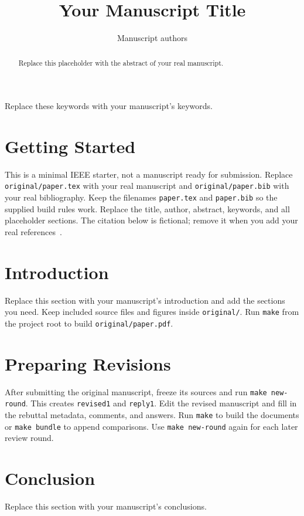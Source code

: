 \documentclass[journal]{IEEEtran}
\title{Your Manuscript Title}
\author{Manuscript authors}
\begin{document}
\maketitle
\begin{abstract}
Replace this placeholder with the abstract of your real manuscript.
\end{abstract}
\begin{IEEEkeywords}
Replace these keywords with your manuscript's keywords.
\end{IEEEkeywords}
\section{Getting Started}
This is a minimal IEEE starter, not a manuscript ready for submission.
Replace \texttt{original/paper.tex} with your real manuscript and
\texttt{original/paper.bib} with your real bibliography. Keep the filenames
\texttt{paper.tex} and \texttt{paper.bib} so the supplied build rules work.
Replace the title, author, abstract, keywords, and all placeholder sections.
The citation below is fictional; remove it when you add your real references~\cite{placeholder}.
\section{Introduction}
Replace this section with your manuscript's introduction and add the sections you need.
Keep included source files and figures inside \texttt{original/}.
Run \texttt{make} from the project root to build \texttt{original/paper.pdf}.
\section{Preparing Revisions}
After submitting the original manuscript, freeze its sources and run
\texttt{make new-round}. This creates \texttt{revised1} and \texttt{reply1}.
Edit the revised manuscript and fill in the rebuttal metadata, comments, and answers.
Run \texttt{make} to build the documents or \texttt{make bundle} to append comparisons.
Use \texttt{make new-round} again for each later review round.
\section{Conclusion}
Replace this section with your manuscript's conclusions.


\end{document}
